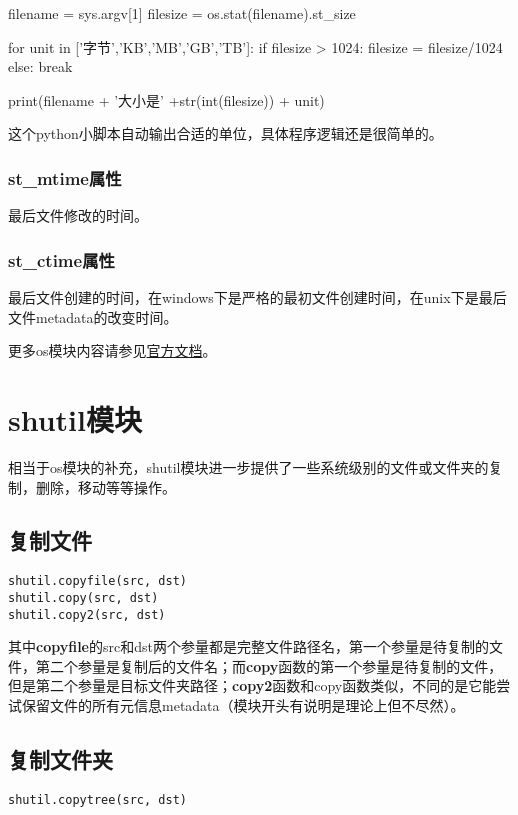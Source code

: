 \documentclass[12pt,oneside]{book}
\begin{document}
\begin{common-format}
\begin{tcbpython}[]
filename = sys.argv[1]
filesize = os.stat(filename).st_size

for unit in ['字节','KB','MB','GB','TB']:
    if filesize > 1024:
        filesize = filesize/1024
    else:
        break

print(filename + '大小是' +str(int(filesize)) + unit)
\end{tcbpython}
这个python小脚本自动输出合适的单位，具体程序逻辑还是很简单的。

\subsection{st\_{}mtime属性}
最后文件修改的时间。

\subsection{st\_{}ctime属性}
最后文件创建的时间，在windows下是严格的最初文件创建时间，在unix下是最后文件metadata的改变时间。


\begin{large}
更多os模块内容请参见\href{https://docs.python.org/3.4/library/os.html}{官方文档}。
\end{large}

\chapter{shutil模块}
相当于os模块的补充，shutil模块进一步提供了一些系统级别的文件或文件夹的复制，删除，移动等等操作。

\section{复制文件}
\begin{Verbatim}
shutil.copyfile(src, dst)
shutil.copy(src, dst)
shutil.copy2(src, dst)
\end{Verbatim}
其中\textbf{copyfile}的src和dst两个参量都是完整文件路径名，第一个参量是待复制的文件，第二个参量是复制后的文件名；而\textbf{copy}函数的第一个参量是待复制的文件，但是第二个参量是目标文件夹路径；\textbf{copy2}函数和copy函数类似，不同的是它能尝试保留文件的所有元信息metadata（模块开头有说明是理论上但不尽然）。

\section{复制文件夹}
\begin{Verbatim}
shutil.copytree(src, dst)
\end{Verbatim}


\end{common-format}
\end{document}

